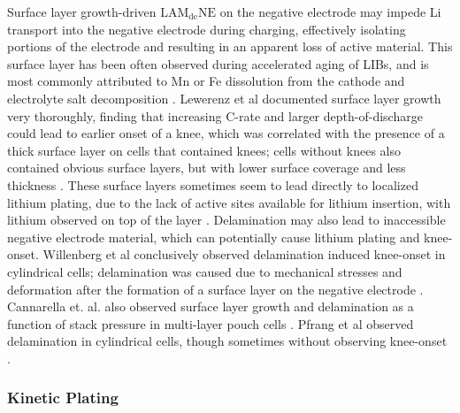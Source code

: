 \documentclass{article}
\begin{document}
Surface layer growth-driven $\mathrm{LAM_{de}NE}$ on the negative electrode may impede Li transport into the negative electrode during charging, effectively isolating portions of the electrode and resulting in an apparent loss of active material. This surface layer has been often observed during accelerated aging of LIBs, and is most commonly attributed to Mn or Fe dissolution from the cathode and electrolyte salt decomposition \cite{lewerenz_post-mortem_2017,lewerenz_systematic_2017,zhu_investigation_2021,stiaszny_electrochemical_2014,rahe_nanoscale_2019,keil_linear_2019,sarasketa-zabala_understanding_2015, willenberg_high-precision_2020}. Lewerenz et al documented surface layer growth very thoroughly, finding that increasing C-rate and larger depth-of-discharge could lead to earlier onset of a knee, which was correlated with the presence of a thick surface layer on cells that contained knees; cells without knees also contained obvious surface layers, but with lower surface coverage and less thickness \cite{lewerenz_post-mortem_2017,lewerenz_systematic_2017}. These surface layers sometimes seem to lead directly to localized lithium plating, due to the lack of active sites available for lithium insertion, with lithium observed on top of the layer \cite{zhu_investigation_2021}. Delamination may also lead to inaccessible negative electrode material, which can potentially cause lithium plating and knee-onset. Willenberg et al conclusively observed delamination induced knee-onset in cylindrical cells; delamination was caused due to mechanical stresses and deformation after the formation of a surface layer on the negative electrode \cite{willenberg_high-precision_2020}. Cannarella et. al. also observed surface layer growth and delamination as a function of stack pressure in multi-layer pouch cells \cite{cannarella_stress_2014}. Pfrang et al observed delamination in cylindrical cells, though sometimes without observing knee-onset \cite{pfrang_long-term_2018}.

\subsubsection{Kinetic Plating}
\end{document}
